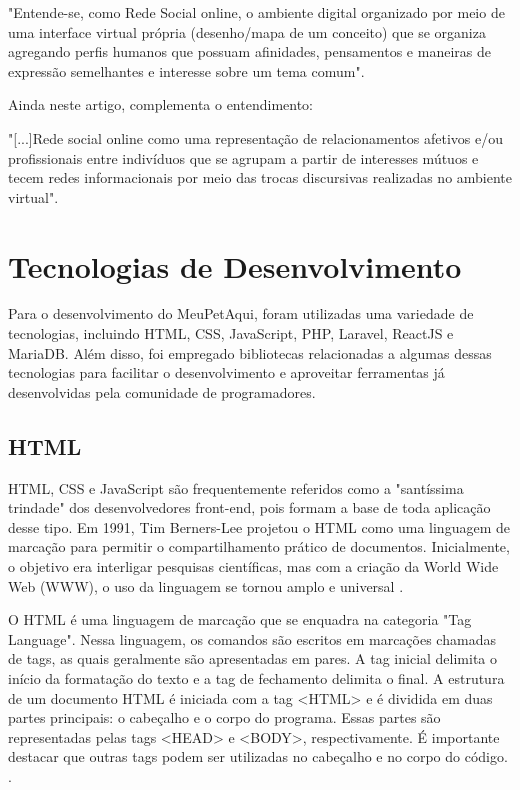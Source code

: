 \begin{citacao}
"Entende-se, como Rede Social online, o ambiente digital organizado por meio de uma interface virtual própria (desenho/mapa de um conceito) que se organiza agregando perfis humanos que possuam afinidades, pensamentos e maneiras de expressão semelhantes e interesse sobre um tema comum".
\end{citacao}

Ainda neste artigo,  complementa o entendimento:
 
 \begin{citacao}
"[...]Rede social online como uma representação de relacionamentos afetivos e/ou profissionais entre indivíduos que se agrupam a partir de interesses mútuos e tecem redes informacionais por meio das trocas discursivas realizadas no ambiente virtual".
\end{citacao}

\section{Tecnologias de Desenvolvimento}
\label{sec:TecnologiasDeDesenvolvimento}
Para o desenvolvimento do MeuPetAqui, foram utilizadas uma variedade de tecnologias, incluindo \gls{HTML}, \gls{CSS}, JavaScript, \gls{PHP}, Laravel, ReactJS e MariaDB. Além disso, foi empregado bibliotecas relacionadas a algumas dessas tecnologias para facilitar o desenvolvimento e aproveitar ferramentas já desenvolvidas pela comunidade de programadores. 

\subsection{HTML}
HTML, CSS e JavaScript são frequentemente referidos como a "santíssima trindade" dos desenvolvedores front-end, pois formam a base de toda aplicação desse tipo. Em 1991, Tim Berners-Lee projetou o HTML como uma linguagem de marcação para permitir o compartilhamento prático de documentos. Inicialmente, o objetivo era interligar pesquisas científicas, mas com a criação da World Wide Web (\gls{WWW}), o uso da linguagem se tornou amplo e universal .

O HTML é uma linguagem de marcação que se enquadra na categoria "Tag Language". Nessa linguagem, os comandos são escritos em marcações chamadas de tags, as quais geralmente são apresentadas em pares. A tag inicial delimita o início da formatação do texto e a tag de fechamento delimita o final. A estrutura de um documento HTML é iniciada com a tag <HTML> e é dividida em duas partes principais: o cabeçalho e o corpo do programa. Essas partes são representadas pelas tags <HEAD> e <BODY>, respectivamente. É importante destacar que outras tags podem ser utilizadas no cabeçalho e no corpo do código. \cite[p. 6-7]{Pedroso}.

